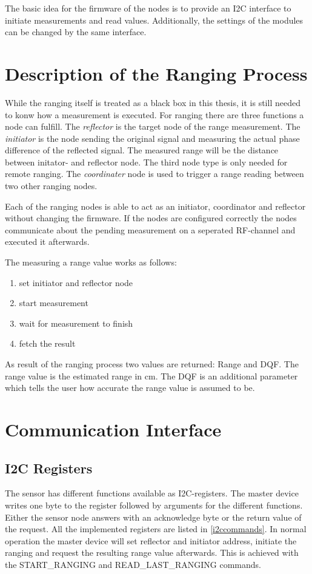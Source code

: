 
The basic idea for the firmware of the nodes is to provide an I2C interface to initiate measurements and read values.
Additionally, the settings of the modules can be changed by the same interface.

\section{Description of the Ranging Process}

While the ranging itself is treated as a black box in this thesis, it is still needed to konw how a measurement is executed.
For ranging there are three functions a node can fulfill.
The \emph{reflector} is the target node of the range measurement.
The \emph{initiator} is the node sending the original signal and measuring the actual phase difference of the reflected signal.
The measured range will be the distance between initator- and reflector node.
The third node type is only needed for remote ranging.
The \emph{coordinater} node is used to trigger a range reading between two other ranging nodes.

Each of the ranging nodes is able to act as an initiator, coordinator and reflector without changing the firmware.
If the nodes are configured correctly the nodes communicate about the pending measurement on a seperated RF-channel and executed it afterwards.

The measuring a range value works as follows:
\begin{enumerate}
	\item set initiator and reflector node
	\item start measurement
	\item wait for measurement to finish
	\item fetch the result
\end{enumerate}

As result of the ranging process two values are returned: Range and DQF.
The range value is the estimated range in cm.
The DQF is an additional parameter which tells the user how accurate the range value is assumed to be.

\section{Communication Interface}


\subsection{I2C Registers}
The sensor has different functions available as I2C-registers.
The master device writes one byte to the register followed by arguments for the different functions.
Either the sensor node answers with an acknowledge byte or the return value of the request.
All the implemented registers are listed in \autoref{i2ccommands}.
In normal operation the master device will set reflector and initiator address, initiate the ranging and request the resulting range value afterwards.
This is achieved with the START\_RANGING and READ\_LAST\_RANGING commands.

